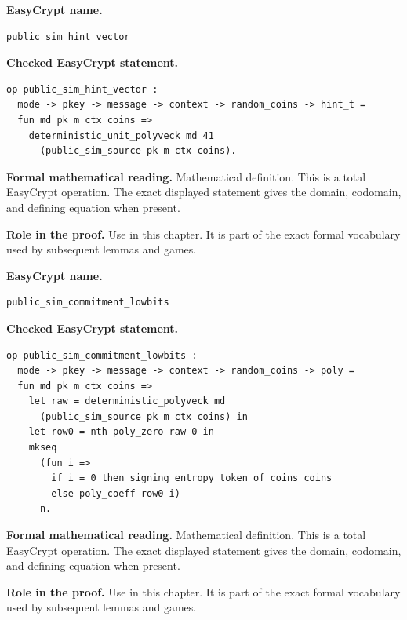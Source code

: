 \begin{formaldefinition}
\noindent\textbf{EasyCrypt name.}
\begin{lstlisting}[language=EasyCrypt,basicstyle=\ttfamily\scriptsize]
public_sim_hint_vector
\end{lstlisting}
\noindent\textbf{Checked EasyCrypt statement.}
\begin{lstlisting}[language=EasyCrypt,basicstyle=\ttfamily\scriptsize]
op public_sim_hint_vector :
  mode -> pkey -> message -> context -> random_coins -> hint_t =
  fun md pk m ctx coins =>
    deterministic_unit_polyveck md 41
      (public_sim_source pk m ctx coins).
\end{lstlisting}
\noindent\textbf{Formal mathematical reading.}
Mathematical definition. This is a total EasyCrypt operation.  The exact displayed statement gives the domain, codomain, and defining equation when present.

\noindent\textbf{Role in the proof.}
Use in this chapter. It is part of the exact formal vocabulary used by subsequent lemmas and games.

\end{formaldefinition}

\begin{formaldefinition}
\noindent\textbf{EasyCrypt name.}
\begin{lstlisting}[language=EasyCrypt,basicstyle=\ttfamily\scriptsize]
public_sim_commitment_lowbits
\end{lstlisting}
\noindent\textbf{Checked EasyCrypt statement.}
\begin{lstlisting}[language=EasyCrypt,basicstyle=\ttfamily\scriptsize]
op public_sim_commitment_lowbits :
  mode -> pkey -> message -> context -> random_coins -> poly =
  fun md pk m ctx coins =>
    let raw = deterministic_polyveck md
      (public_sim_source pk m ctx coins) in
    let row0 = nth poly_zero raw 0 in
    mkseq
      (fun i =>
        if i = 0 then signing_entropy_token_of_coins coins
        else poly_coeff row0 i)
      n.
\end{lstlisting}
\noindent\textbf{Formal mathematical reading.}
Mathematical definition. This is a total EasyCrypt operation.  The exact displayed statement gives the domain, codomain, and defining equation when present.

\noindent\textbf{Role in the proof.}
Use in this chapter. It is part of the exact formal vocabulary used by subsequent lemmas and games.

\end{formaldefinition}

